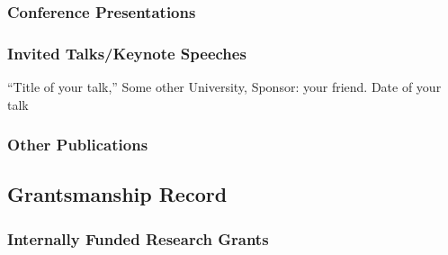 \subsubsection{Conference Presentations}

\subsubsection{Invited Talks/Keynote Speeches}
\begin{myenum}
\item ``Title of your talk,'' Some other University,
  Sponsor: your friend. Date of your talk
\end{myenum}

\subsubsection{Other Publications}



\subsection{Grantsmanship Record}


\subsubsection{Internally Funded Research Grants}

